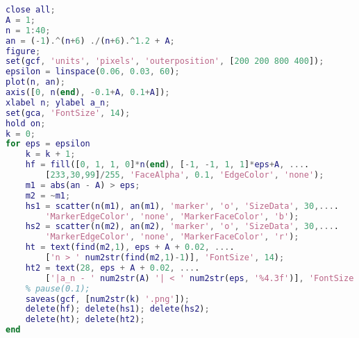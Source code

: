\begin{lstlisting}[language=matlab, caption=lim\_demo.m]
% 数列极限的动画演示
close all;
A = 1;
n = 1:40;
an = (-1).^(n+6) ./(n+6).^1.2 + A;
figure;
set(gcf, 'units', 'pixels', 'outerposition', [200 200 800 400]);
epsilon = linspace(0.06, 0.03, 60);
plot(n, an);
axis([0, n(end), -0.1+A, 0.1+A]);
xlabel n; ylabel a_n;
set(gca, 'FontSize', 14);
hold on;
k = 0;
for eps = epsilon
    k = k + 1;
    hf = fill([0, 1, 1, 0]*n(end), [-1, -1, 1, 1]*eps+A, ....
        [233,30,99]/255, 'FaceAlpha', 0.1, 'EdgeColor', 'none');
    m1 = abs(an - A) > eps;
    m2 = ~m1;
    hs1 = scatter(n(m1), an(m1), 'marker', 'o', 'SizeData', 30,....
        'MarkerEdgeColor', 'none', 'MarkerFaceColor', 'b');
    hs2 = scatter(n(m2), an(m2), 'marker', 'o', 'SizeData', 30,....
        'MarkerEdgeColor', 'none', 'MarkerFaceColor', 'r');
    ht = text(find(m2,1), eps + A + 0.02, ....
        ['n > ' num2str(find(m2,1)-1)], 'FontSize', 14);
    ht2 = text(28, eps + A + 0.02, ....
        ['|a_n - ' num2str(A) '| < ' num2str(eps, '%4.3f')], 'FontSize', 14);
    % pause(0.1);
    saveas(gcf, [num2str(k) '.png']);
    delete(hf); delete(hs1); delete(hs2);
    delete(ht); delete(ht2);
end
\end{lstlisting}
